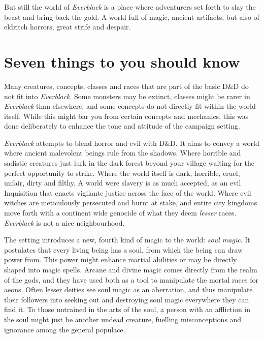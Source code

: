 But still the world of \emph{Everblack} is a place where adventurers set forth
to slay the beast and bring back the gold. A world full of magic, ancient
artifacts, but also of eldritch horrors, great strife and despair.

\section{Seven things to you should know}

\begin{enumerate}
  Many creatures, concepts, classes and
 races that are part of the basic D\&D do not fit into \emph{Everblack}. Some
 monsters may be extinct, classes might be rarer in \emph{Everblack} than
 elsewhere, and some concepts do not directly fit within the world
 itself. While this might bar you from certain concepts and mechanics, this
 was done deliberately to enhance the tone and attitude of the campaign
 setting.

  \emph{Everblack} attempts to blend horror and evil with
 D\&D. It aims to convey a world where ancient malevolent beings rule from the
 shadows. Where horrible and sadistic creatures just lurk in the dark forest
 beyond your village waiting for the perfect opportunity to strike. Where the
 world itself is dark, horrible, cruel, unfair, dirty and filthy. A world were
 slavery is as much accepted, as an evil Inquisition that enacts vigilante
 justice across the face of the world. Where evil witches are meticulously
 persecuted and burnt at stake, and entire city kingdoms move forth with a
 continent wide genocide of what they deem \emph{lesser} races.
 \emph{Everblack} is not a nice neighbourhood.

  The setting introduces a new, fourth kind of magic to the
 world: \emph{soul magic}. It postulates that every living being has a soul,
 from which the being can draw power from. This power might enhance martial
 abilities or may be directly shaped into magic spells. Arcane and divine
 magic comes directly from the realm of the gods, and they have used both as a
 tool to manipulate the mortal races for aeons. Often
 \hyperref[sec:Religion]{lesser deities} see soul magic as an aberration, and
 thus manipulate their followers into seeking out and destroying soul magic
 everywhere they can find it. To those untrained in the arts of the soul, a
 person with an affliction in the soul might just be another undead creature,
 fuelling misconceptions and ignorance among the general populace.


\end{enumerate}
